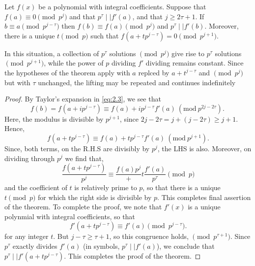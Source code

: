 \documentclass[11pt]{article}
\begin{document}
\begin{theorem}\label{2.24}
	Let \(f(x)\) be a polynomial with integral coefficients. Suppose that \(f(a) \equiv 0 \pmod{p^j}\) and that \(p^\tau \mid\mid f'(a)\), and that \(j \geq 2\tau + 1\). If \(b \equiv a \pmod{p^{j-\tau}}\) then \(f(b) \equiv f(a) \pmod{p^j}\) and \(p^\tau \mid\mid f'(b)\). Moreover, there is a unique \(t \pmod{p}\) such that \(f(a + tp^{j-\tau}) = 0 \pmod{p^{j+1}}\).
\end{theorem}
In this situation, a collection of \(p^\tau\) solutions \(\pmod{p^j}\) give rise to \(p^\tau\) solutions \(\pmod{p^{j+1}}\), while the power of \(p\) dividing \(f'\) dividing remains constant. Since the hypotheses of the theorem apply with \(a\) replced by \(a + t^{j - \tau}\) and \(\pmod{p^j}\) but with \(\tau\) unchanged, the lifting may be repeated and continues indefinitely 
\begin{proof}
	By Taylor's expansion in \ref{eq:2.3}, we see that 
	\begin{equation*}
		f(b) = f(a + ip^{j-\tau}) \equiv f(a) + ip^{j-\tau}f'(a) \ (\text{mod} \ p^{2j-2\tau}).\ 
	\end{equation*}
	Here, the modulus is divisible by \(p^{j+1}\), since \(2j - 2\tau = j + (j - 2\tau) \geq j + 1\). Hence, 
	\begin{equation*}
		f(a + tp^{j - \tau}) \equiv f(a) + tp^{j - \tau}f'(a) \ (\text{mod} \ p^{j+1}). 
	\end{equation*}
	Since, both terms, on the R.H.S are divisibly by \(p^j\), the LHS is also. Moreover, on dividing through \(p^j\) we find that,\
	\begin{equation*}
		\frac{f(a + tp^{j - \tau})}{p^j} \equiv \frac{f(a){p^j}} + t\frac{f'(a)}{p^\tau} \pmod{p} 
	\end{equation*}
	and the coefficient of \(t\) is relatively prime to \(p\), so that there is a unique \(t \pmod{p}\) for which the right side is divisible by \(p\). This completes final assertion of the theorem. To complete the proof, we note that \(f'(x)\) is a unique polynmial with integral coefficients, so that 
\begin{equation*}
	f'(a + tp^{j - \tau}) \equiv f'(a)\pmod{p^{j - \tau}}.
\end{equation*}
for any integer \(t\). But \(j - \tau \geq \tau + 1\), so this congruence holds, \(\pmod{p ^{\tau + 1}}\). Since \(p^\tau\) exactly divides \(f'(a)\) (in symbols, \(p^\tau \mid\mid f'(a)\)), we conclude that \(p^\tau \mid\mid f'(a + tp^{j - \tau})\). This completes the proof of the theorem.
\end{proof}
\end{document}
